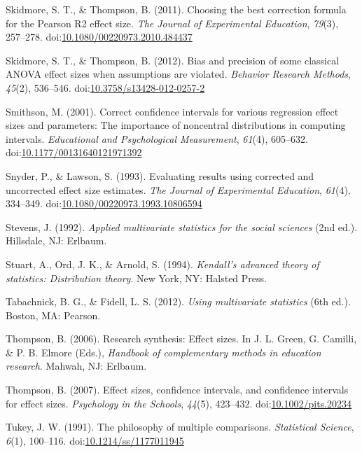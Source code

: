 \documentclass[english,man]{apa6}
\theoremstyle{definition}
\theoremstyle{definition}
\theoremstyle{definition}
\theoremstyle{remark}
\begin{document}
\hypertarget{ref-Skidmore2011}{}
Skidmore, S. T., \& Thompson, B. (2011). Choosing the best correction
formula for the Pearson R2 effect size. \emph{The Journal of
Experimental Education}, \emph{79}(3), 257--278.
doi:\href{https://doi.org/10.1080/00220973.2010.484437}{10.1080/00220973.2010.484437}

\hypertarget{ref-Skidmore2012}{}
Skidmore, S. T., \& Thompson, B. (2012). Bias and precision of some
classical ANOVA effect sizes when assumptions are violated.
\emph{Behavior Research Methods}, \emph{45}(2), 536--546.
doi:\href{https://doi.org/10.3758/s13428-012-0257-2}{10.3758/s13428-012-0257-2}

\hypertarget{ref-Smithson2001}{}
Smithson, M. (2001). Correct confidence intervals for various regression
effect sizes and parameters: The importance of noncentral distributions
in computing intervals. \emph{Educational and Psychological
Measurement}, \emph{61}(4), 605--632.
doi:\href{https://doi.org/10.1177/00131640121971392}{10.1177/00131640121971392}

\hypertarget{ref-Snyder1993}{}
Snyder, P., \& Lawson, S. (1993). Evaluating results using corrected and
uncorrected effect size estimates. \emph{The Journal of Experimental
Education}, \emph{61}(4), 334--349.
doi:\href{https://doi.org/10.1080/00220973.1993.10806594}{10.1080/00220973.1993.10806594}

\hypertarget{ref-Stevens1992}{}
Stevens, J. (1992). \emph{Applied multivariate statistics for the social
sciences} (2nd ed.). Hillsdale, NJ: Erlbaum.

\hypertarget{ref-Stuart1994}{}
Stuart, A., Ord, J. K., \& Arnold, S. (1994). \emph{Kendall's advanced
theory of statistics: Distribution theory}. New York, NY: Halsted Press.

\hypertarget{ref-Tabachnick2012}{}
Tabachnick, B. G., \& Fidell, L. S. (2012). \emph{Using multivariate
statistics} (6th ed.). Boston, MA: Pearson.

\hypertarget{ref-Thompson2006}{}
Thompson, B. (2006). Research synthesis: Effect sizes. In J. L. Green,
G. Camilli, \& P. B. Elmore (Eds.), \emph{Handbook of complementary
methods in education research}. Mahwah, NJ: Erlbaum.

\hypertarget{ref-Thompson2007}{}
Thompson, B. (2007). Effect sizes, confidence intervals, and confidence
intervals for effect sizes. \emph{Psychology in the Schools},
\emph{44}(5), 423--432.
doi:\href{https://doi.org/10.1002/pits.20234}{10.1002/pits.20234}

\hypertarget{ref-Tukey1991}{}
Tukey, J. W. (1991). The philosophy of multiple comparisons.
\emph{Statistical Science}, \emph{6}(1), 100--116.
doi:\href{https://doi.org/10.1214/ss/1177011945}{10.1214/ss/1177011945}
\end{document}
